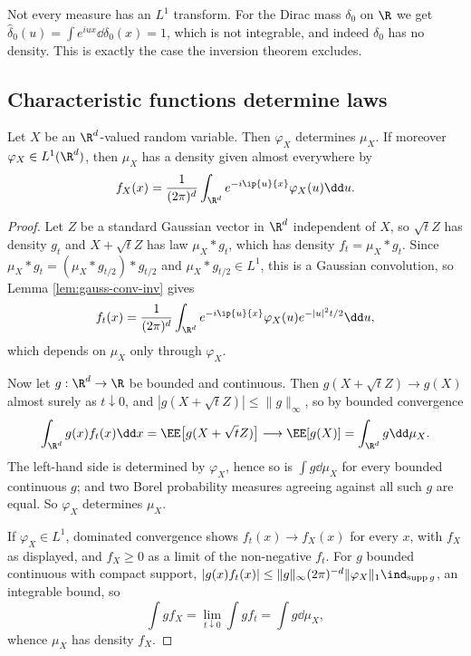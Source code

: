 \begin{example}
	Not every measure has an $L^1$ transform. For the Dirac mass $\delta_0$ on $\R$ we get $\hat\delta_0(u)=\int e^{iux}\dd\delta_0(x)=1$, which is not integrable, and indeed $\delta_0$ has no density. This is exactly the case the inversion theorem excludes.
\end{example}

\subsection{Characteristic functions determine laws}

\begin{theorem}[Uniqueness]\label{thm:cf-unique}
	Let $X$ be an $\R^d$-valued random variable. Then $\varphi_X$ determines $\mu_X$. If moreover $\varphi_X \in L^1(\R^d)$, then $\mu_X$ has a density given almost everywhere by
	$$
	f_X(x)=\frac{1}{(2\pi)^d}\int_{\R^d}e^{-i\ip{u}{x}}\varphi_X(u)\dd u.
	$$
\end{theorem}
\begin{proof}
	Let $Z$ be a standard Gaussian vector in $\R^d$ independent of $X$, so $\sqrt tZ$ has density $g_t$ and $X+\sqrt tZ$ has law $\mu_X * g_t$, which has density $f_t = \mu_X*g_t$. Since $\mu_X*g_t=(\mu_X*g_{t/2})*g_{t/2}$ and $\mu_X * g_{t/2}\in L^1$, this is a Gaussian convolution, so Lemma \ref{lem:gauss-conv-inv} gives
	$$
	f_t(x) = \frac{1}{(2\pi)^d}\int_{\R^d}e^{-i\ip{u}{x}}\varphi_X(u)e^{-|u|^2t/2}\dd u,
	$$
	which depends on $\mu_X$ only through $\varphi_X$.

	Now let $g : \R^d\to\R$ be bounded and continuous. Then $g(X+\sqrt tZ)\to g(X)$ almost surely as $t\downarrow0$, and $|g(X+\sqrt tZ)|\leq\|g\|_\infty$, so by bounded convergence
	$$
	\int_{\R^d}g(x)f_t(x)\dd x = \EE\big[g(X+\sqrt t Z)\big]\longrightarrow \EE[g(X)]=\int_{\R^d}g\dd\mu_X.
	$$
	The left-hand side is determined by $\varphi_X$, hence so is $\int g\dd\mu_X$ for every bounded continuous $g$; and two Borel probability measures agreeing against all such $g$ are equal. So $\varphi_X$ determines $\mu_X$.

	If $\varphi_X \in L^1$, dominated convergence shows $f_t(x)\to f_X(x)$ for every $x$, with $f_X$ as displayed, and $f_X \geq 0$ as a limit of the non-negative $f_t$. For $g$ bounded continuous with compact support, $|g(x)f_t(x)|\leq\|g\|_\infty(2\pi)^{-d}\|\varphi_X\|_1\ind_{\mathrm{supp}\,g}$, an integrable bound, so
	$$
	\int g f_X = \lim_{t\downarrow0}\int gf_t = \int g\dd\mu_X,
	$$
	whence $\mu_X$ has density $f_X$.
\end{proof}

